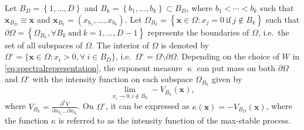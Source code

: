 \documentclass[12pt]{article}
\begin{document}
Let $B_D = \left\{ 1, \ldots, D \right\}$ and $B_k = \left\{ b_1, \ldots, b_k\right\} \subset B_D$, where $b_1 < \cdots < b_k$ such that $\bm x_{B_D} \equiv \bm x$ and $\bm x_{B_k} = \left( x_{b_1}, \ldots, x_{b_k}\right)$. Let $\Omega_{B_k} = \left\{ \bm x \in \Omega: x_j=0\ \text{if}\  j \notin B_k \right\}$
such that $\partial\Omega = \left\{ \Omega_{B_k}, \forall B_k \ \text{and}\ k=1, \ldots, D-1 \right\}$ represents the boundaries of $\Omega$, i.e.~the set of all subspaces of $\Omega$. The interior of $\Omega$ is denoted by $\Omega^\circ = \{\bm x\in \Omega: x_i>0,\forall\ i \in B_D\}$, i.e.~$\Omega^\circ = \Omega \setminus \partial \Omega$. Depending on the choice of $W$ in \eqref{eq:spectralrepresentation}, the exponent measure $\upkappa$ can put mass on both $\partial\Omega$ and $\Omega^\circ$ with the intensity function on each subspace $\Omega_{B_k}$ given by 
\begin{equation}
    \label{eq:angular_density}
        \lim_{x_i\to 0, i\notin B_k} - V_{B_k}(\bm x),
\end{equation}
where $V_{B_k} = \frac{\partial^k V}{\partial x_{b_1}\dots\partial x_{b_k}}$. On $\Omega^\circ$, it can be expressed as 
$\kappa(\bm x)= - V_{B_D}(\bm x)$,
where the function $\kappa$ is referred to as the intensity function of the max-stable process.

\end{document}
